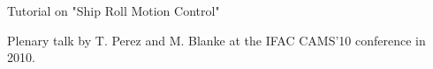 Tutorial on "Ship Roll Motion Control"


Plenary talk by T. Perez and M. Blanke at the IFAC CAMS'10 conference in 2010.